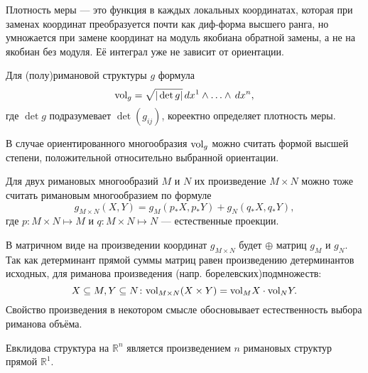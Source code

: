 \begin{to_def}
	Плотность меры --- это функция в каждых локальных координатах, которая при заменах координат преобразуется почти как диф-форма высшего ранга, но умножается при замене координат на модуль якобиана обратной замены, а не на якобиан без модуля. Её интеграл уже не зависит от ориентации.
\end{to_def}

\begin{to_lem}
	Для (полу)римановой структуры $g$ формула
	\begin{equation*}
		\textnormal{vol}_g = \sqrt{|\det g|} \, d x^1 \wedge \ldots \wedge \, d x^n,
	\end{equation*}
	где $\det g$ подразумевает $\det (g_{i j})$, кореектно определяет плотность меры.
\end{to_lem}

В случае ориентированного многообразия $\textnormal{vol}_{g}$ можно считать формой высшей степени, положительной  относительно выбранной ориентации.

Для двух римановых многообразий $M$ и $N$ их произведение $M \times N$ можно  тоже считать римановым многообразием по формуле
\begin{equation*}
	g_{M \times N}(X,Y) = g_{M}(p_*X, p_*Y) + g_{N}(q_*X, q_*Y),
\end{equation*}
где $p \colon M \times N \mapsto M$ и $q \colon M \times N \mapsto N$ --- естественные проекции.

В матричном виде на произведении координат $g_{M\times N}$ будет $\oplus$ матриц $g_M $ и $g_N$. Так как детерминант прямой суммы матриц равен произведению детерминантов исходных, для риманова произведения (напр. борелевских)подмножеств:
\begin{equation*}
	X \subseteq M, Y \subseteq N \colon
	\textnormal{vol}_{M \times N} (X \times Y) = \textnormal{vol}_M X \cdot  \textnormal{vol}_N Y.
\end{equation*}
Свойство произведения в некотором смысле обосновывает естественность выбора риманова объёма.

\begin{to_tas}
	Евклидова структура на $\mathbb{R}^n$ является произведением $n$ римановых структур прямой $\mathbb{R}^1$.
\end{to_tas}